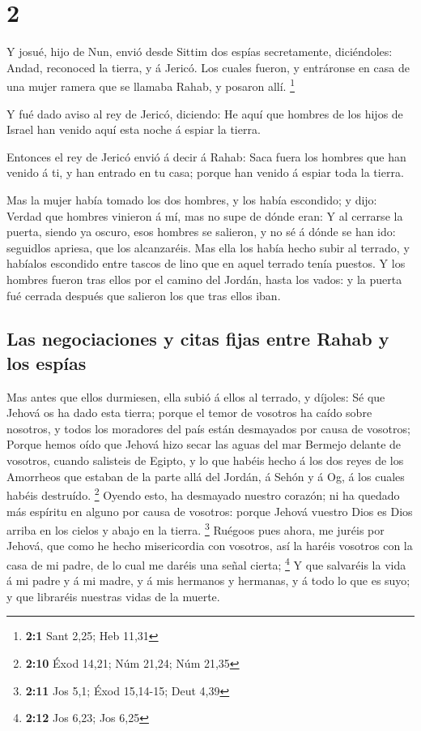 \hypertarget{section-1}{%
\section{2}\label{section-1}}

 Y josué, hijo de Nun, envió desde Sittim dos espías
secretamente, diciéndoles: Andad, reconoced la tierra, y á Jericó. Los
cuales fueron, y entráronse en casa de una mujer ramera que se llamaba
Rahab, y posaron allí. \footnote{\textbf{2:1} Sant 2,25; Heb 11,31}

 Y fué dado aviso al rey de Jericó, diciendo: He aquí que
hombres de los hijos de Israel han venido aquí esta noche á espiar la
tierra.

 Entonces el rey de Jericó envió á decir á Rahab: Saca fuera
los hombres que han venido á ti, y han entrado en tu casa; porque han
venido á espiar toda la tierra.

 Mas la mujer había tomado los dos hombres, y los había
escondido; y dijo: Verdad que hombres vinieron á mí, mas no supe de
dónde eran:  Y al cerrarse la puerta, siendo ya oscuro, esos
hombres se salieron, y no sé á dónde se han ido: seguidlos apriesa, que
los alcanzaréis.  Mas ella los había hecho subir al terrado,
y habíalos escondido entre tascos de lino que en aquel terrado tenía
puestos.  Y los hombres fueron tras ellos por el camino del
Jordán, hasta los vados: y la puerta fué cerrada después que salieron
los que tras ellos iban.

\hypertarget{las-negociaciones-y-citas-fijas-entre-rahab-y-los-espuxedas}{%
\subsection{Las negociaciones y citas fijas entre Rahab y los
espías}\label{las-negociaciones-y-citas-fijas-entre-rahab-y-los-espuxedas}}

 Mas antes que ellos durmiesen, ella subió á ellos al
terrado, y díjoles:  Sé que Jehová os ha dado esta tierra;
porque el temor de vosotros ha caído sobre nosotros, y todos los
moradores del país están desmayados por causa de vosotros; 
Porque hemos oído que Jehová hizo secar las aguas del mar Bermejo
delante de vosotros, cuando salisteis de Egipto, y lo que habéis hecho á
los dos reyes de los Amorrheos que estaban de la parte allá del Jordán,
á Sehón y á Og, á los cuales habéis destruído. \footnote{\textbf{2:10}
  Éxod 14,21; Núm 21,24; Núm 21,35}  Oyendo esto, ha
desmayado nuestro corazón; ni ha quedado más espíritu en alguno por
causa de vosotros: porque Jehová vuestro Dios es Dios arriba en los
cielos y abajo en la tierra. \footnote{\textbf{2:11} Jos 5,1; Éxod
  15,14-15; Deut 4,39}  Ruégoos pues ahora, me juréis por
Jehová, que como he hecho misericordia con vosotros, así la haréis
vosotros con la casa de mi padre, de lo cual me daréis una señal cierta;
\footnote{\textbf{2:12} Jos 6,23; Jos 6,25}  Y que
salvaréis la vida á mi padre y á mi madre, y á mis hermanos y hermanas,
y á todo lo que es suyo; y que libraréis nuestras vidas de la muerte.

